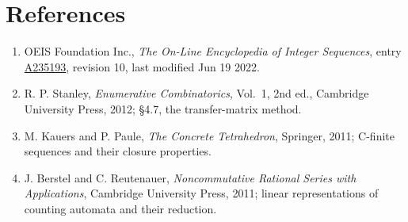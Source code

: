 \documentclass[11pt]{article}
\theoremstyle{definition}
\begin{document}
\section{References}

\begin{enumerate}

\item OEIS Foundation Inc., \emph{The On-Line Encyclopedia of Integer Sequences}, entry \href{https://oeis.org/A235193}{A235193}, revision 10, last modified Jun 19 2022.

\item R. P. Stanley, \emph{Enumerative Combinatorics}, Vol.~1, 2nd ed., Cambridge University Press, 2012; \S4.7, the transfer-matrix method.

\item M. Kauers and P. Paule, \emph{The Concrete Tetrahedron}, Springer, 2011; C-finite sequences and their closure properties.

\item J. Berstel and C. Reutenauer, \emph{Noncommutative Rational Series with Applications}, Cambridge University Press, 2011; linear representations of counting automata and their reduction.

\end{enumerate}
\end{document}

